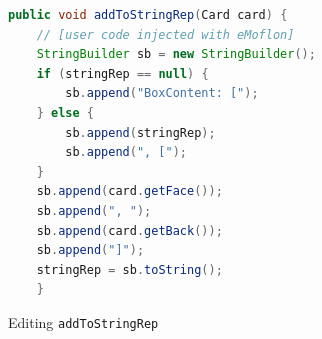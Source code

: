 \newpage

\vspace*{3cm}

\begin{figure}[h!]
\centering
\begin{lstlisting}[language=Java, keywordstyle={\bfseries\color{purple}}, backgroundcolor=\color{white}]
public void addToStringRep(Card card) {
	// [user code injected with eMoflon]
	StringBuilder sb = new StringBuilder();
	if (stringRep == null) {
		sb.append("BoxContent: [");
	} else {
		sb.append(stringRep);
		sb.append(", [");
	}
	sb.append(card.getFace());
	sb.append(", ");
	sb.append(card.getBack());
	sb.append("]");
	stringRep = sb.toString();
	}
        \end{lstlisting}
        \caption{Editing \texttt{addToStringRep}}
        \label{code:addToStringRep_inject_file}
    \end{figure}
    \FloatBarrier





